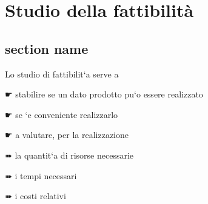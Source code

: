 \chapter{Studio della fattibilità} %
\label{cha:studio_della_fattibilita}

\section{section name} %
\label{sec:section_name}

%

Lo studio di fattibilit`a serve a

☛ stabilire se un dato prodotto pu`o essere realizzato

☛ se `e conveniente realizzarlo

☛ a valutare, per la realizzazione

➠ la quantit`a di risorse necessarie

➠ i tempi necessari

➠ i costi relativi